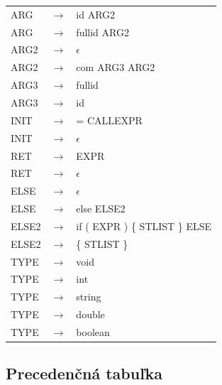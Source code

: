 \documentclass[11pt,a4paper]{article}
\begin{document}
\begin{tabular}{l c l}
		ARG &$\rightarrow$& id ARG2 \\
		ARG &$\rightarrow$& fullid ARG2 \\
		ARG2 &$\rightarrow$& $\epsilon$ \\
		ARG2 &$\rightarrow$& com ARG3 ARG2 \\
		ARG3 &$\rightarrow$& fullid \\
		ARG3 &$\rightarrow$& id \\
		INIT &$\rightarrow$& = CALLEXPR \\
		INIT &$\rightarrow$& $\epsilon$ \\
		RET &$\rightarrow$& EXPR \\
		RET &$\rightarrow$& $\epsilon$ \\
		ELSE &$\rightarrow$& $\epsilon$ \\
		ELSE &$\rightarrow$& else ELSE2 \\
		ELSE2 &$\rightarrow$& if ( EXPR ) \{ STLIST \} ELSE \\
		ELSE2 &$\rightarrow$& \{ STLIST \} \\
		TYPE &$\rightarrow$& void \\
		TYPE &$\rightarrow$& int \\
		TYPE &$\rightarrow$& string \\
		TYPE &$\rightarrow$& double \\
		TYPE &$\rightarrow$& boolean \\
	\end{tabular}
	
	
	\newpage
	\subsection{Precedenčná tabuľka}
	\label{tabulka}
	
\end{document}
